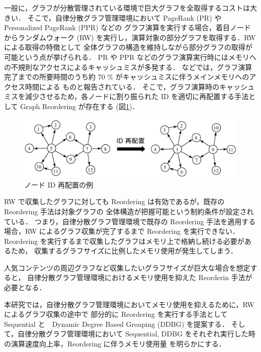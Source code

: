 一般に，グラフが分散管理されている環境で巨大グラフを全取得するコストは大きい．
そこで，自律分散グラフ管理環境において PageRank (PR) \cite{page1999pagerank} や Personalized PageRank (PPR) \cite{page1999pagerank} などの
グラフ演算を実行する場合，着目ノードからランダムウォーク (RW) を実行し，演算対象の部分グラフを取得する．RW による取得の特徴として
全体グラフの構造を維持しながら部分グラフの取得が可能という点が挙げられる．
PR や PPR などのグラフ演算実行時にはメモリへの不規則なアクセスによるキャッシュミスが多発する．
\cite{wei2016speedup,zhang2017making} などでは，グラフ演算完了までの所要時間のうち約 70 \% がキャッシュミスに伴うメインメモリへのアクセス時間による
ものと報告されている．
そこで，グラフ演算時のキャッシュミスを減少させるため，各ノードに割り振られた ID を適切に再配置する手法として 
Graph Reordering が存在する (図\ref{reordering_intro})．
\begin{figure}[t]
  \centering
  \includegraphics[width=\linewidth]{./figure/reordering_intro.pdf}
  \caption{ノード ID 再配置の例}
  \label{reordering_intro}
\end{figure}
RW で収集したグラフに対しても Reordering は有効であるが，既存の Reordering 手法は対象グラフの
全体構造が把握可能という制約条件が設定されている．
つまり，自律分散グラフ管理環境で既存の Reordering 手法を適用する場合，RW によるグラフ収集が完了するまで Reordering を実行できない．
Reordering を実行するまで収集したグラフはメモリ上で格納し続ける必要があるため，
収集するグラフサイズに比例したメモリ使用が発生してしまう．

人気コンテンツの周辺グラフなど収集したいグラフサイズが巨大な場合を想定すると，
自律分散グラフ管理環境におけるメモリ使用を抑えた Reorderin 手法が必要となる．

本研究では，自律分散グラフ管理環境においてメモリ使用を抑えるために，RW によるグラフ収集の途中で
部分的に Reordering を実行する手法として Sequential と　Dynamic Degree Based Grouping (DDBG) を提案する．
そして，自律分散グラフ管理環境において Sequential, DDBG をそれぞれ実行した時の演算速度向上率，Reordering に伴うメモリ使用量
を明らかにする．
